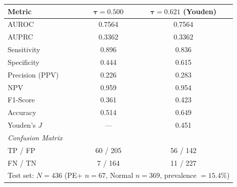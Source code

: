 \documentclass[border=8pt]{standalone}
\begin{document}
\begin{tabular}{l cc}
\toprule
\textbf{Metric} & $\boldsymbol{\tau = 0.500}$ & $\boldsymbol{\tau = 0.621}$ \textbf{(Youden)} \\
\midrule
AUROC          & 0.7564 & 0.7564 \\
AUPRC          & 0.3362 & 0.3362 \\
Sensitivity    & 0.896 & 0.836 \\
Specificity    & 0.444 & 0.615 \\
Precision (PPV) & 0.226 & 0.283 \\
NPV            & 0.959 & 0.954 \\
F1-Score       & 0.361 & 0.423 \\
Accuracy       & 0.514 & 0.649 \\
Youden's $J$   & --- & 0.451 \\
\midrule
\multicolumn{3}{l}{\textit{Confusion Matrix}} \\
\quad TP / FP  & 60 / 205 & 56 / 142 \\
\quad FN / TN  & 7 / 164 & 11 / 227 \\
\bottomrule
\multicolumn{3}{l}{\footnotesize Test set: $N=436$ (PE+ $n=67$, Normal $n=369$, prevalence $=15.4\%$)} \\
\end{tabular}
\end{document}
